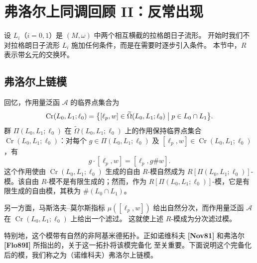 
\section{弗洛尔上同调回顾 II：反常出现}
\label{sec:2-4}

设 $L_i$（$i=0,1$）是 $(M,\omega)$ 中两个相互横截的拉格朗日子流形。
开始时我们不对拉格朗日子流形 $L_i$ 施加任何条件，而是在需要时逐步引入条件。
本节中，$R$ 表示带幺元的交换环。

\subsection{弗洛尔上链模}
\label{sec:2-4-1}

回忆，作用量泛函 $\mathcal A$ 的临界点集合为
\[
  \operatorname{Cr}(L_0,L_1;\ell_0)
  =\bigl\{[\ell_p,w]\in\widetilde\Omega(L_0,L_1;\ell_0)
    \bigm|p\in L_0\cap L_1\bigr\}.
\]
群 $\Pi(L_0,L_1;\ell_0)$ 在
$\widetilde\Omega(L_0,L_1;\ell_0)$ 上的作用保持临界点集合
$\operatorname{Cr}(L_0,L_1;\ell_0)$：对每个
$g\in\Pi(L_0,L_1;\ell_0)$ 及
$[\ell_p,w]\in\operatorname{Cr}(L_0,L_1;\ell_0)$，有
\begin{equation}
  g\cdot[\ell_p,w]=[\ell_p,g\#w].
  \tag{2.4.1}\label{eq:2-4-1}
\end{equation}
这个作用使由 $\operatorname{Cr}(L_0,L_1;\ell_0)$ 生成的自由 $R$-模自然成为
$R[\Pi(L_0,L_1;\ell_0)]$-模。该自由 $R$-模不是有限生成的；然而，作为
$R[\Pi(L_0,L_1;\ell_0)]$-模，它是有限生成的自由模，其秩为
$\#(L_0\cap L_1)$。

另一方面，马斯洛夫--莫尔斯指标 $\mu([\ell_p,w])$ 给出自然分次，而作用量泛函
$\mathcal A$ 在 $\operatorname{Cr}(L_0,L_1;\ell_0)$ 上给出一个滤过。
这就使上述 $R$-模成为分次滤过模。

特别地，这个模带有自然的非阿基米德拓扑。正如诺维科夫
\textbf{[Nov81]} 和弗洛尔\textbf{[Flo89I]} 所指出的，关于这一拓扑将该模完备化
至关重要。下面说明这个完备化后的模，我们称之为（诺维科夫）弗洛尔上链模。

